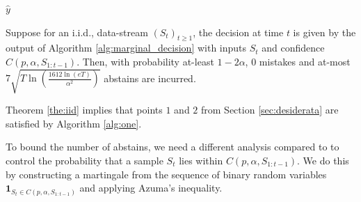 \begin{algorithm}
\caption{Decision making with confidence set}\label{alg:marginal_decision}

  \Return $\hat{y}$
  

\end{algorithm}

\begin{theorem}
Suppose for an i.i.d., data-stream $(S_t)_{t\geq 1}$, the decision at time $t$ is given by the output of Algorithm \ref{alg:marginal_decision} with inputs $S_t$ and confidence $C(p,\alpha, S_{1:t-1})$. Then, with probability at-least $1-2\alpha$, $0$ mistakes and at-most $7 \sqrt{T \ln \left( \frac{1612\ln(eT)}{\alpha^2} \right)}$ abstains are incurred. 
\label{the:iid}
\end{theorem}

\begin{remark}
   Theorem \ref{the:iid}  implies that points $1$ and $2$ from Section \ref{sec:desiderata} are satisfied by Algorithm \ref{alg:one}.
    \end{remark}



\begin{remark}
   To bound the number of abstains, we need a different analysis compared to \cite{howard2022sequential} to control the probability that a sample $S_{t}$ lies within $C(p,\alpha, S_{1:t-1})$. We do this by constructing a martingale from the sequence of binary random variables $\mathbf{1}_{S_t \in C(p,\alpha, S_{1:t-1})}$ and applying Azuma's inequality. %
\end{remark}

